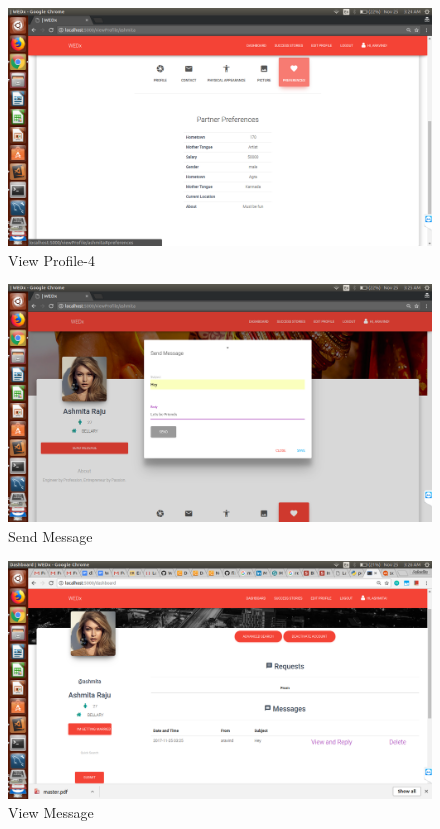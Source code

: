 \documentclass[12pt]{report}
\begin{document}
\begin{figure}[!htb]
    \centering
    \includegraphics[width=1\textwidth]{sc-15.png}
    \caption{View Profile-4}
    \label{fig:View Profile-4}
\end{figure}

\begin{figure}[!htb]
    \centering
    \includegraphics[width=1\textwidth]{sc-16.png}
    \caption{Send Message}
    \label{fig:Send Message}
\end{figure}

\begin{figure}[!htb]
    \centering
    \includegraphics[width=1\textwidth]{sc-17.png}
    \caption{View Message}
    \label{fig:View Message}
\end{figure}
\end{document}

